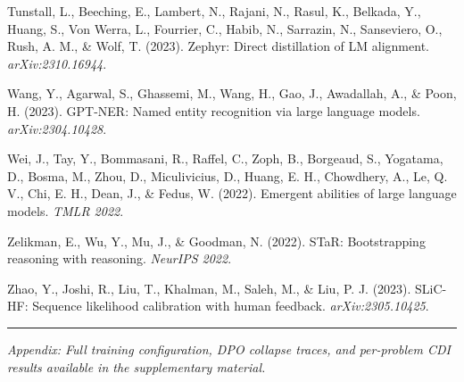 \documentclass[
  11pt,
]{article}
\begin{document}
Tunstall, L., Beeching, E., Lambert, N., Rajani, N., Rasul, K.,
Belkada, Y., Huang, S., Von Werra, L., Fourrier, C., Habib, N.,
Sarrazin, N., Sanseviero, O., Rush, A. M., \& Wolf, T. (2023). Zephyr:
Direct distillation of LM alignment. \emph{arXiv:2310.16944}.

Wang, Y., Agarwal, S., Ghassemi, M., Wang, H., Gao, J.,
Awadallah, A., \& Poon, H. (2023). GPT-NER: Named entity recognition via
large language models. \emph{arXiv:2304.10428}.

Wei, J., Tay, Y., Bommasani, R., Raffel, C., Zoph, B.,
Borgeaud, S., Yogatama, D., Bosma, M., Zhou, D., Miculivicius, D.,
Huang, E. H., Chowdhery, A., Le, Q. V., Chi, E. H., Dean, J., \& Fedus,
W. (2022). Emergent abilities of large language models. \emph{TMLR 2022}.

Zelikman, E., Wu, Y., Mu, J., \& Goodman, N. (2022). STaR:
Bootstrapping reasoning with reasoning. \emph{NeurIPS 2022}.

Zhao, Y., Joshi, R., Liu, T., Khalman, M., Saleh, M., \& Liu,
P. J. (2023). SLiC-HF: Sequence likelihood calibration with human
feedback. \emph{arXiv:2305.10425}.

\begin{center}\rule{0.5\linewidth}{0.5pt}\end{center}

\emph{Appendix: Full training configuration, DPO collapse traces, and
per-problem CDI results available in the supplementary material.}
\end{document}

